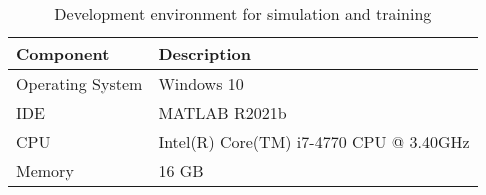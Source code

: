 \begin{table}[htbp]
    \centering
    \begin{tabular}{ll}
        \toprule
        Component        & Description                             \\\midrule
        Operating System & Windows 10                              \\
        \ac{IDE}              & MATLAB R2021b                           \\
        \ac{CPU}              & Intel(R) Core(TM) i7-4770 CPU @ 3.40GHz \\
        Memory           & 16 GB                                   \\\bottomrule
        \end{tabular}%
    \caption{Development environment for simulation and training}
    \label{tab:env}
\end{table}